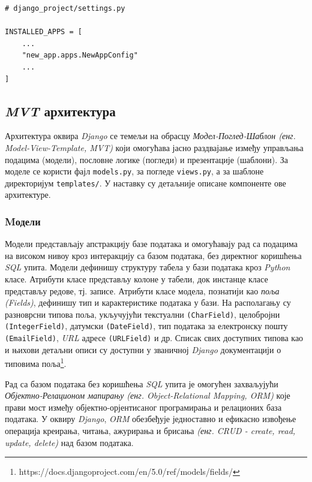\documentclass[12pt,oneside]{memoir}
\begin{document}
\begin{lstlisting}
# django_project/settings.py

INSTALLED_APPS = [
    ...
    "new_app.apps.NewAppConfig"
    ...
]
\end{lstlisting}

\subsection{\textit{MVT} архитектура}

Архитектура оквира \textit{Django} се темељи на обрасцу \textit{Модел-Поглед-Шаблон (енг. Model-View-Template, MVT)} који омогућава јасно раздвајање између 
управљања подацима (модели), пословне логике (погледи) и презентације (шаблони). За моделе се користи фајл \texttt{models.py}, за погледе  \texttt{views.py}, а за шаблоне директоријум \texttt{templates/}. У наставку су детаљније описане компоненте ове архитектуре.

\subsubsection{Mодели}

Модели представљају апстракцију базе података и омогућавају рад са подацима на високом нивоу кроз интеракцију са базом података, без директног коришћења \textit{SQL} упита. Модели дефинишу структуру табела у бази података кроз \textit{Python} класе. Атрибути класе представљу колоне у табели, док инстанце класе представљу редове, тј. записе. Атрибути класе модела, познатији као \textit{поља (Fields)}, дефинишу тип и карактеристике података у бази. На располагању су разноврсни типова поља, укључујући текстуални \texttt{(CharField)}, целобројни \texttt{(IntegerField)}, датумски \texttt{(DateField)}, тип података за електронску пошту \texttt{(EmailField)}, \textit{URL} адресе \texttt{(URLField)} и др. Списак свих доступних типова као и њихови детаљни описи су доступни у званичној \textit{Django} документацији о типовима поља\footnote{https://docs.djangoproject.com/en/5.0/ref/models/fields/}.

Рад са базом података без коришћења \textit{SQL} упита је омогућен захваљујући \textit{Објектно-Релационом мапирању (енг. Object-Relational Mapping, ORM)} које прави мост између објектно-орјентисаног програмирања и релационих база података. У оквиру \textit{Django}, \textit{ORM} обезбеђује једноставно и ефикасно извођење операција креирања, читања, ажурирања и брисања \textit{(енг. CRUD - create, read, update, delete)} над базом података.
\end{document}
